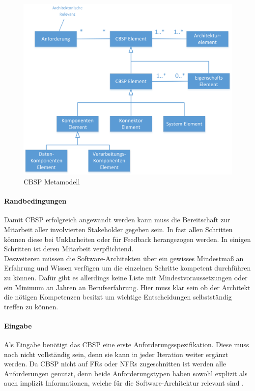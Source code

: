 \begin{figure}[h]
	\centering
	\includegraphics[scale=0.6]{cbsp_meta_model.png} 
	\caption{CBSP Metamodell \cite{Gru01}}
	\label{fig_cbsp_meta_model}
\end{figure}

\paragraph{Randbedingungen}

Damit CBSP erfolgreich angewandt werden kann muss die Bereitschaft zur Mitarbeit aller involvierten Stakeholder gegeben sein. In fast allen Schritten können diese bei Unklarheiten oder für Feedback herangezogen werden. In einigen Schritten ist deren Mitarbeit verpflichtend. \\
Desweiteren müssen die Software-Architekten über ein gewisses Mindestmaß an Erfahrung und Wissen verfügen um die einzelnen Schritte kompetent durchführen zu können. Dafür gibt es allerdings keine Liste mit Mindestvoraussetzungen oder ein Minimum an Jahren an Berufserfahrung. Hier muss klar sein ob der Architekt die nötigen Kompetenzen besitzt um wichtige Entscheidungen selbstständig treffen zu können. \\

\paragraph{Eingabe}

Als Eingabe benötigt das CBSP eine erste Anforderungsspezifikation. Diese muss noch nicht vollständig sein, denn sie kann in jeder Iteration weiter ergänzt werden. Da CBSP nicht auf FRs oder NFRs zugeschnitten ist werden alle Anforderungen genutzt, denn beide Anforderungstypen haben sowohl explizit als auch implizit Informationen, welche für die Software-Architektur relevant sind \cite{Gru01}. \\



